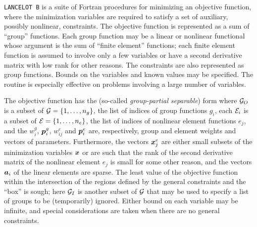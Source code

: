 \documentclass{galahad}
\newcommand{\packagename}{LANCELOT B}
\begin{document}
\galheader


\galsummary

{\tt \packagename} is a suite of Fortran procedures for minimizing an
objective function, where the minimization variables are required to
satisfy a set of auxiliary, possibly nonlinear, constraints.  The
objective function is represented as a sum of ``group'' functions.  Each
group function may be a linear or nonlinear functional whose argument is
the sum of ``finite element'' functions; each finite element function is
assumed to involve only a few variables or have a second derivative
matrix with low rank for other reasons. The constraints are also
represented as group functions.  Bounds on the variables and known
values may be specified.  The routine is especially effective on
problems involving a large number of variables.

\galbasics

The objective function has the (so-called {\em group-partial separable}) form
where
$\calG_O$ is a subset of $\calG=\{1,  \ldots, n_g \}$,  the list of indices
of group functions $g_i$, each
$\calE_i$ is a subset of $\calE=\{1,  \ldots, n_e \}$,  the list of
indices of nonlinear element functions $e_j$, and
the $w^g_i$, ${\bm{p}}^g_i$, $w^e_{ij}$ and ${\bm{p}}^e_{i}$
are, respectively, group and element weights and vectors of parameters.
Furthermore, the  vectors ${\bm{x}}^e_j$  are either small subsets of the
minimization variables ${\bm{x}}$
or are such that the rank of the second derivative matrix
of the nonlinear element $e_j$ is small for some other reason, and the
vectors ${\bm{a}}_i$ of the linear elements  are sparse.  The  least value of
the objective function within the intersection of
the regions defined by the general constraints
and the ``box''
is sough; here $\calG_I$ is another subset of  $\calG$ that may be used to
specify a list of groups to be (temporarily) ignored.
Either bound on each variable may be infinite, and special
considerations are taken when there are no general constraints.
\end{document}
